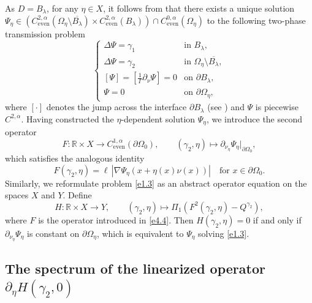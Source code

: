 \documentclass[reqno]{amsart}
\numberwithin{equation}{section}
\numberwithin{equation}{section}
\numberwithin{equation}{section}
\begin{document}
As $D=B_{\lambda}$, for any $\eta\in X$, it follows from \cite{AS} that there exists a unique solution $\Psi_{\eta}\in \left(C_{\mathrm{even}}^{2,\alpha}(\Omega_{\eta}\setminus\overline{B_{\lambda}})\times C_{\mathrm{even}}^{2,\alpha}(B_{\lambda})\right)\cap C_{\mathrm{even}}^{0,\alpha}(\Omega_{\eta})$ to the following two-phase transmission problem
\begin{equation}\label{e4.3}
\begin{cases}
\Delta \Psi = \gamma_1 & \text{in } B_\lambda, \\
\Delta \Psi = \gamma_2 & \text{in } \Omega_\eta \setminus \overline{B_\lambda}, \\
\left[ \Psi \right] =\left [\tfrac{1}{\Gamma} \partial_\nu \Psi \right] = 0 & \text{on } \partial B_\lambda, \\
\Psi = 0 & \text{on } \partial \Omega_\eta,
\end{cases}
\end{equation}
where \(\left[\cdot \right]\) denotes the jump across the interface \(\partial B_\lambda\) (see \cite{AS}) and $\Psi$ is piecewise $C^{2,\alpha}$. Having constructed the \(\eta\)-dependent solution \(\Psi_\eta\), we introduce the second operator
\begin{equation}\label{e4.4}
F \colon \mathbb{R} \times X \to C_{\mathrm{even}}^{1,\alpha}(\partial \Omega_0), \qquad (\gamma_2, \eta) \mapsto \partial_{\nu_\eta} \Psi_\eta \big|_{\partial \Omega_0},
\end{equation}
which satisfies the analogous identity
\begin{equation}\label{e4.5}
F(\gamma_2,\eta) = \ell \, |\nabla \Psi_\eta(x + \eta(x)\nu(x))| \quad \text{for } x \in \partial \Omega_0.
\end{equation}
Similarly, we reformulate problem \eqref{e1.3} as an abstract operator equation on the spaces \(X\) and \(Y\). Define
\begin{equation}\label{e4.6}
H \colon \mathbb{R} \times X \to Y, \qquad (\gamma_2, \eta) \mapsto \Pi_1\left( F^2(\gamma_2, \eta) - Q^{\gamma_2}\right),
\end{equation}
where \(F\) is the operator introduced in \eqref{e4.4}. Then \(H(\gamma_2, \eta) = 0\) if and only if \(\partial_{\nu_\eta} \Psi_\eta\) is constant on \(\partial \Omega_\eta\), which is equivalent to \(\Psi_\eta\) solving \eqref{e1.3}.

\subsection{The spectrum of the linearized operator \(\partial_\eta H(\gamma_2,0)\)}
\end{document}

